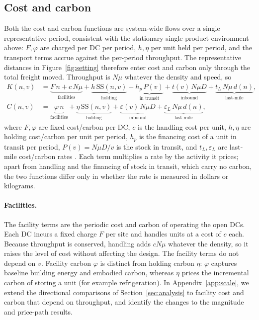 \documentclass[11pt]{article}
\numberwithin{proposition}{section}
\theoremstyle{definition}
\theoremstyle{remark}
\theoremstyle{plain}
\newcommand{\sstock}{\mathrm{SS}}
\begin{document}
\subsection{Cost and carbon}

Both the cost and carbon functions are system-wide flows over a single
representative period, consistent with the stationary single-product environment above:
$F,\varphi$ are charged per DC per period, $h,\eta$ per unit held per period, and the transport terms accrue
against the per-period throughput. The representative distances in Figure~\ref{fig:setting} therefore enter
cost and carbon only through the total freight moved. Throughput is $N\mu$ whatever the density and speed, so
\begin{align}
  K(n,v) &= \underbrace{F\,n+c\,N\mu}_{\text{facilities}} + \underbrace{h\,\sstock(n,v)}_{\text{holding}} + \underbrace{h_p\,P(v)}_{\text{in transit}}
            + \underbrace{t(v)\,N\mu D}_{\text{inbound}} + \underbrace{t_L\,N\mu\,d(n)}_{\text{last-mile}},
            \label{eq:K}\\[2pt]
  C(n,v) &= \underbrace{\varphi\,n}_{\text{facilities}} + \underbrace{\eta\,\sstock(n,v)}_{\text{holding}}
            + \underbrace{\varepsilon(v)\,N\mu D}_{\text{inbound}} + \underbrace{\varepsilon_L\,N\mu\,d(n)}_{\text{last-mile}},
            \label{eq:C}
\end{align}
where $F,\varphi$ are fixed cost/carbon per DC, $c$ is the handling cost per unit, $h,\eta$ are holding cost/carbon per unit per period,
$h_p$ is the financing cost of a unit in transit per period, $P(v)=N\mu D/v$ is the stock in transit, and
$t_L,\varepsilon_L$ are last-mile cost/carbon rates \citep{shen2003joint, hua2011managing,
benjaafar2013carbon}. Each term multiplies a rate by the activity it prices; apart from handling and the financing of stock in transit,
which carry no carbon, the two functions differ only in whether the rate is measured in dollars or kilograms.

\paragraph{Facilities.} The facility terms are the periodic cost and carbon of operating the open DCs. Each DC
incurs a fixed charge $F$ per site and handles units at a cost of $c$ each. Because throughput is conserved,
handling adds $cN\mu$ whatever the density, so it raises the level of cost without affecting the design. The
facility terms do not depend on $v$. Facility carbon $\varphi$ is distinct from holding carbon $\eta$: $\varphi$
captures baseline building energy and embodied carbon, whereas $\eta$ prices the incremental carbon of storing a
unit (for example refrigeration). In Appendix~\ref{app:scale}, we extend the directional comparisons of
Section~\ref{sec:analysis} to facility cost and carbon that depend on throughput, and identify the changes to the
magnitude and price-path results.
\end{document}
